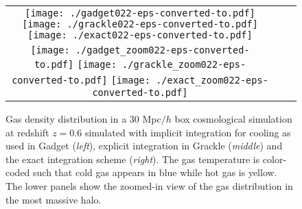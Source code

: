 \documentclass[a4paper,fleqn,usenatbib,useAMS, twocolumn]{mnras}
\begin{document}
\begin{figure*}
\begin{center}
\begin{tabular}{ccc}
\texttt{[image: ./gadget022-eps-converted-to.pdf]}
\texttt{[image: ./grackle022-eps-converted-to.pdf]}
\texttt{[image: ./exact022-eps-converted-to.pdf]}\\
\texttt{[image: ./gadget\_zoom022-eps-converted-to.pdf]}
\texttt{[image: ./grackle\_zoom022-eps-converted-to.pdf]}
\texttt{[image: ./exact\_zoom022-eps-converted-to.pdf]}\\
\end{tabular}
\caption{\label{fig:gas_image} 
Gas density distribution in a 30 Mpc$/h$ box cosmological simulation at 
redshift $z = 0.6$ simulated with implicit integration for cooling as used in {\sc Gadget} ({\it left}), 
explicit integration in {\sc Grackle} ({\it middle}) and the exact integration scheme  ({\it right}). The gas temperature is 
color-coded such that cold gas appears in blue while hot gas is yellow. The lower panels
show the zoomed-in view of the gas distribution in the most massive halo. }
\end{center}
\end{figure*}
\end{document}

